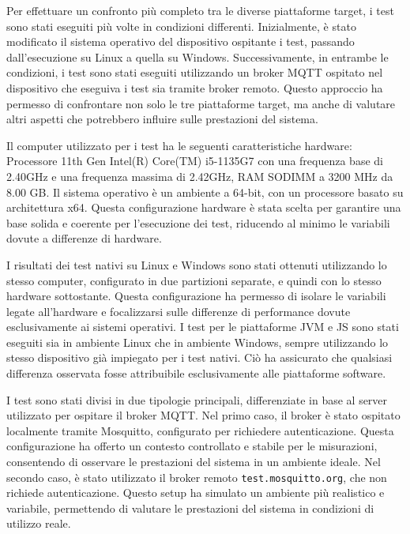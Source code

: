 \documentclass[12pt,a4paper,openright,twoside]{book}
\begin{document}
Per effettuare un confronto più completo tra le diverse piattaforme target, i test sono stati eseguiti più volte in condizioni differenti. 
Inizialmente, è stato modificato il sistema operativo del dispositivo ospitante i test, passando dall'esecuzione su Linux a quella su Windows. 
Successivamente, in entrambe le condizioni, i test sono stati eseguiti utilizzando un broker \ac{MQTT} ospitato nel dispositivo che eseguiva i test sia tramite broker remoto. 
Questo approccio ha permesso di confrontare non solo le tre piattaforme target, ma anche di valutare altri aspetti che potrebbero influire sulle prestazioni del sistema.

Il computer utilizzato per i test ha le seguenti caratteristiche hardware: Processore 11th Gen Intel(R) Core(TM) i5-1135G7 con una frequenza base di 2.40GHz e una 
frequenza massima di 2.42GHz, RAM SODIMM a 3200 MHz da 8.00 GB. Il sistema operativo è un ambiente a 64-bit, con un processore basato su architettura x64. 
Questa configurazione hardware è stata scelta per garantire una base solida e coerente per l'esecuzione dei test, riducendo al minimo le variabili dovute a differenze di hardware. 

I risultati dei test nativi su Linux e Windows sono stati ottenuti utilizzando lo stesso computer, configurato in due partizioni separate, e quindi con lo stesso hardware sottostante. 
Questa configurazione ha permesso di isolare le variabili legate all'hardware e focalizzarsi sulle differenze di performance dovute esclusivamente ai sistemi operativi. 
I test per le piattaforme JVM e JS sono stati eseguiti sia in ambiente Linux che in ambiente Windows, sempre utilizzando lo stesso dispositivo già impiegato per i test nativi. 
Ciò ha assicurato che qualsiasi differenza osservata fosse attribuibile esclusivamente alle piattaforme software.

I test sono stati divisi in due tipologie principali, differenziate in base al server utilizzato per ospitare il broker \ac{MQTT}. Nel primo caso, il broker è stato ospitato 
localmente tramite Mosquitto, configurato per richiedere autenticazione. Questa configurazione ha offerto un contesto controllato e stabile per le misurazioni, consentendo 
di osservare le prestazioni del sistema in un ambiente ideale. Nel secondo caso, è stato utilizzato il broker remoto \texttt{test.mosquitto.org}, che non richiede autenticazione. 
Questo setup ha simulato un ambiente più realistico e variabile, permettendo di valutare le prestazioni del sistema in condizioni di utilizzo reale.
\end{document}

